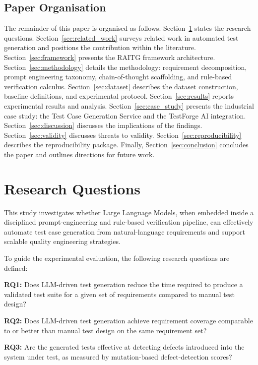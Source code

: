 \documentclass[11pt,letterpaper]{article}
\begin{document}
\subsection{Paper Organisation}

The remainder of this paper is organised as follows.
Section~\ref{sec:rq} states the research questions.
Section~\ref{sec:related_work} surveys related work in automated test generation and positions the contribution within the literature.
Section~\ref{sec:framework} presents the RAITG framework architecture.
Section~\ref{sec:methodology} details the methodology: requirement decomposition, prompt engineering taxonomy, chain-of-thought scaffolding, and rule-based verification calculus.
Section~\ref{sec:dataset} describes the dataset construction, baseline definitions, and experimental protocol.
Section~\ref{sec:results} reports experimental results and analysis.
Section~\ref{sec:case_study} presents the industrial case study: the Test Case Generation Service and the TestForge AI integration.
Section~\ref{sec:discussion} discusses the implications of the findings.
Section~\ref{sec:validity} discusses threats to validity.
Section~\ref{sec:reproducibility} describes the reproducibility package.
Finally, Section~\ref{sec:conclusion} concludes the paper and outlines directions for future work.

\section{Research Questions}
\label{sec:rq}

This study investigates whether Large Language Models, when embedded inside a disciplined prompt-engineering and rule-based verification pipeline, can effectively automate test case generation from natural-language requirements and support scalable quality engineering strategies.

To guide the experimental evaluation, the following research questions are defined:

\textbf{RQ1:} Does LLM-driven test generation reduce the time required to produce a validated test suite for a given set of requirements compared to manual test design?

\textbf{RQ2:} Does LLM-driven test generation achieve requirement coverage comparable to or better than manual test design on the same requirement set?

\textbf{RQ3:} Are the generated tests effective at detecting defects introduced into the system under test, as measured by mutation-based defect-detection scores?
\end{document}
